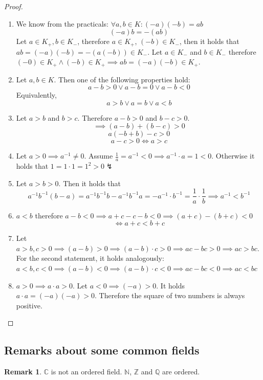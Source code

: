 \documentclass[a4paper,landscape,twocolumn]{article}
\theoremstyle{definition}
\newtheorem{rem}{Remark}
\begin{document}
\begin{proof}
  \begin{enumerate}
    \item We know from the practicals: $\forall a,b \in K: (-a)(-b) = ab$
      \[ (-a) b = -(ab) \]
      Let $a \in K_+, b \in K_-$, therefore $a \in K_+$, $(-b) \in K_-$,
      then it holds that $ab = (-a)(-b) = -(a(-b)) \in K_-$.
      Let $a \in K_-$ and $b \in K_-$ therefore $(-0) \in K_+ \land (-b) \in K_+
      \implies ab = (-a)(-b) \in K_+$.
    \item Let $a, b \in K$. Then one of the following properties hold:
      \[ a - b > 0 \lor a - b = 0 \lor a - b < 0 \]
      Equivalently,
      \[ a > b \lor a = b \lor a < b \]
    \item Let $a > b$ and $b > c$. Therefore $a - b > 0$ and $b - c > 0$.
      \[ \implies (a - b) + (b - c) > 0 \]
      \[ a(- b + b) - c > 0 \]
      \[ a - c > 0 \iff a > c \]
    \item Let $a > 0 \implies a^{-1} \neq 0$.
      Assume $\frac{1}{a} = a^{-1} < 0 \implies a^{-1} \cdot a = 1 < 0$.
      Otherwise it holds that $1 = 1 \cdot 1 = 1^2 > 0 \lightning$
    \item Let $a > b > 0$. Then it holds that
      \[
          a^{-1} b^{-1} (b - a)
          = a^{-1} b^{-1} b - a^{-1} b^{-1} a
          = -a^{-1} \cdot b^{-1}
          = \frac1a \cdot \frac1b
          \implies a^{-1} < b^{-1}
      \]
    \item $a < b$ therefore $a - b < 0 \implies a + c - c - b < 0 \implies (a + c) - (b + c) < 0$
      \[ \iff a + c < b + c \]
    \item Let $a > b, c > 0 \implies (a - b) > 0 \implies (a - b) \cdot c > 0 \implies ac - bc > 0
      \implies ac > bc$. For the second statement, it holds analogously:
      $a < b, c < 0 \implies (a - b) < 0 \implies (a - b) \cdot c < 0 \implies ac - bc < 0
        \implies ac < bc$
    \item $a > 0 \implies a \cdot a > 0$.
      Let $a < 0 \implies (-a) > 0$. It holds $a \cdot a = (-a)(-a) > 0$.
      Therefore the square of two numbers is always positive.
  \end{enumerate}
\end{proof}

\subsection{Remarks about some common fields}
\begin{rem}
  $\mathbb{C}$ is not an ordered field.
  $\mathbb{N}$, $\mathbb{Z}$ and $\mathbb{Q}$ are ordered.
\end{rem}
\end{document}
